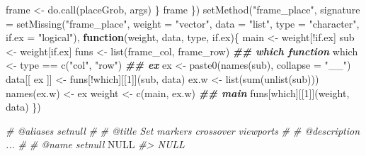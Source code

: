 \documentclass[
]{article}
\newenvironment{Shaded}{\begin{snugshade}}{\end{snugshade}}
\newcommand{\AttributeTok}[1]{\textcolor[rgb]{0.77,0.63,0.00}{#1}}
\newcommand{\CommentTok}[1]{\textcolor[rgb]{0.56,0.35,0.01}{\textit{#1}}}
\newcommand{\ConstantTok}[1]{\textcolor[rgb]{0.00,0.00,0.00}{#1}}
\newcommand{\ControlFlowTok}[1]{\textcolor[rgb]{0.13,0.29,0.53}{\textbf{#1}}}
\newcommand{\DecValTok}[1]{\textcolor[rgb]{0.00,0.00,0.81}{#1}}
\newcommand{\DocumentationTok}[1]{\textcolor[rgb]{0.56,0.35,0.01}{\textbf{\textit{#1}}}}
\newcommand{\FunctionTok}[1]{\textcolor[rgb]{0.00,0.00,0.00}{#1}}
\newcommand{\NormalTok}[1]{#1}
\newcommand{\OtherTok}[1]{\textcolor[rgb]{0.56,0.35,0.01}{#1}}
\newcommand{\SpecialCharTok}[1]{\textcolor[rgb]{0.00,0.00,0.00}{#1}}
\newcommand{\StringTok}[1]{\textcolor[rgb]{0.31,0.60,0.02}{#1}}
\begin{document}
\begin{Shaded}
\begin{Highlighting}[]
\NormalTok{      frame }\OtherTok{\textless{}{-}} \FunctionTok{do.call}\NormalTok{(placeGrob, args)}
\NormalTok{    \}}
\NormalTok{    frame}
\NormalTok{  \})}
\FunctionTok{setMethod}\NormalTok{(}\StringTok{"frame\_place"}\NormalTok{, }
  \AttributeTok{signature =} \FunctionTok{setMissing}\NormalTok{(}\StringTok{"frame\_place"}\NormalTok{,}
    \AttributeTok{weight =} \StringTok{"vector"}\NormalTok{,}
    \AttributeTok{data =} \StringTok{"list"}\NormalTok{,}
    \AttributeTok{type =} \StringTok{"character"}\NormalTok{,}
    \AttributeTok{if.ex =} \StringTok{"logical"}\NormalTok{),}
  \ControlFlowTok{function}\NormalTok{(weight, data, type, if.ex)\{}
\NormalTok{    main }\OtherTok{\textless{}{-}}\NormalTok{ weight[}\SpecialCharTok{!}\NormalTok{if.ex]}
\NormalTok{    sub }\OtherTok{\textless{}{-}}\NormalTok{ weight[if.ex]}
\NormalTok{    funs }\OtherTok{\textless{}{-}} \FunctionTok{list}\NormalTok{(frame\_col, frame\_row)}
    \DocumentationTok{\#\# which function}
\NormalTok{    which }\OtherTok{\textless{}{-}}\NormalTok{ type }\SpecialCharTok{==} \FunctionTok{c}\NormalTok{(}\StringTok{"col"}\NormalTok{, }\StringTok{"row"}\NormalTok{)}
    \DocumentationTok{\#\# ex}
\NormalTok{    ex }\OtherTok{\textless{}{-}} \FunctionTok{paste0}\NormalTok{(}\FunctionTok{names}\NormalTok{(sub), }\AttributeTok{collapse =} \StringTok{"\_\_"}\NormalTok{)}
\NormalTok{    data[[ ex ]] }\OtherTok{\textless{}{-}}\NormalTok{ funs[}\SpecialCharTok{!}\NormalTok{which][[}\DecValTok{1}\NormalTok{]](sub, data)}
\NormalTok{    ex.w }\OtherTok{\textless{}{-}} \FunctionTok{list}\NormalTok{(}\FunctionTok{sum}\NormalTok{(}\FunctionTok{unlist}\NormalTok{(sub)))}
    \FunctionTok{names}\NormalTok{(ex.w) }\OtherTok{\textless{}{-}}\NormalTok{ ex}
\NormalTok{    weight }\OtherTok{\textless{}{-}} \FunctionTok{c}\NormalTok{(main, ex.w)}
    \DocumentationTok{\#\# main}
\NormalTok{    funs[which][[}\DecValTok{1}\NormalTok{]](weight, data)}
\NormalTok{  \})}

\CommentTok{\#\textquotesingle{} @aliases setnull}
\CommentTok{\#\textquotesingle{}}
\CommentTok{\#\textquotesingle{} @title Set markers crossover viewports}
\CommentTok{\#\textquotesingle{}}
\CommentTok{\#\textquotesingle{} @description ...}
\CommentTok{\#\textquotesingle{}}
\CommentTok{\#\textquotesingle{} @name setnull}
\ConstantTok{NULL}
\CommentTok{\#\textgreater{} NULL}


\end{Highlighting}
\end{Shaded}
\end{document}
